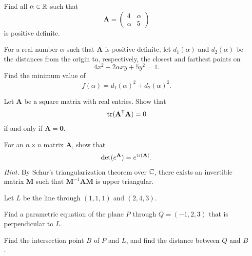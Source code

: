 \begin{problem}
\begin{problemsubparts}
\item Find all $\alpha\in\mathbb{R}$ such that
\[
\mathbf A=
\begin{pmatrix}
4&\alpha\\
\alpha&5
\end{pmatrix}
\]
is positive definite.
\item For a real number $\alpha$ such that $\mathbf A$ is positive definite, let $d_1(\alpha)$ and $d_2(\alpha)$ be the distances from the origin to, respectively, the closest and farthest points on
\[
4x^2+2\alpha xy+5y^2=1.
\]
Find the minimum value of
\[
f(\alpha)=d_1(\alpha)^2+d_2(\alpha)^2.
\]
\end{problemsubparts}
\end{problem}

\begin{problem}
Let $\mathbf A$ be a square matrix with real entries. Show that
\[
\operatorname{tr}(\mathbf A^{\mathsf T}\mathbf A)=0
\]
if and only if $\mathbf A=\mathbf 0$.
\end{problem}

\begin{problem}
For an $n\times n$ matrix $\mathbf A$, show that
\[
\det(e^{\mathbf A})=e^{\operatorname{tr}(\mathbf A)}.
\]
\textit{Hint.} By Schur's triangularization theorem over $\mathbb{C}$, there exists an invertible matrix $\mathbf M$ such that $\mathbf M^{-1}\mathbf A\mathbf M$ is upper triangular.
\end{problem}

\begin{problem}
Let $L$ be the line through $(1,1,1)$ and $(2,4,3)$.
\begin{problemsubparts}
\item Find a parametric equation of the plane $P$ through $Q=(-1,2,3)$ that is perpendicular to $L$.
\item Find the intersection point $B$ of $P$ and $L$, and find the distance between $Q$ and $B$.
\end{problemsubparts}
\end{problem}

